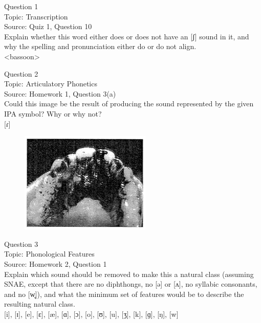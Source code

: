 \documentclass[12pt]{article}
\begin{document}
{\large Question 1}\\

Topic: Transcription\\
Source: Quiz 1, Question 10\\

Explain whether this word either does or does not have an [ʃ] sound in it, and why the spelling and pronunciation either do or do not align.\\

<bassoon>


\newpage

{\large Question 2}\\

Topic: Articulatory Phonetics\\
Source: Homework 1, Question 3(a)\\

Could this image be the result of producing the sound represented by the given IPA symbol? Why or why not?\\

{[ɾ]}

\begin{figure}[H]
\includegraphics{../images/staticpalatography_stop.png}
\end{figure}

\newpage

{\large Question 3}\\

Topic: Phonological Features\\
Source: Homework 2, Question 1\\

Explain which sound should be removed to make this a natural class (assuming SNAE, except that there are no diphthongs, no [ə] or [ʌ], no syllabic consonants, and no [w̥]), and what the minimum set of features would be to describe the resulting natural class.\\

{[i]}, {[ɪ]}, {[e]}, {[ɛ]}, {[æ]}, {[ɑ]}, {[ɔ]}, {[o]}, {[ʊ]}, {[u]}, {[ʒ]}, {[k]}, {[ɡ]}, {[ŋ]}, {[w]}
\end{document}

